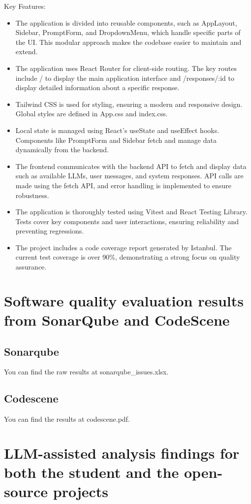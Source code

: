 \documentclass[sigconf]{acmart}
\begin{document}
Key Features:
\begin{itemize}
\item The application is divided into reusable components, such as AppLayout, Sidebar, PromptForm, and DropdownMenu, which handle specific parts of the UI. This modular approach makes the codebase easier to maintain and extend.
\item The application uses React Router for client-side routing. The key routes include / to display the main application interface and /responses/:id to display detailed information about a specific response.
\item Tailwind CSS is used for styling, ensuring a modern and responsive design. Global styles are defined in App.css and index.css.
\item Local state is managed using React's useState and useEffect hooks. Components like PromptForm and Sidebar fetch and manage data dynamically from the backend.
\item The frontend communicates with the backend API to fetch and display data such as available LLMs, user messages, and system responses. API calls are made using the fetch API, and error handling is implemented to ensure robustness.
\item The application is thoroughly tested using Vitest and React Testing Library. Tests cover key components and user interactions, ensuring reliability and preventing regressions.
\item The project includes a code coverage report generated by Istanbul. The current test coverage is over 90\%, demonstrating a strong focus on quality assurance.
\end{itemize}

\section{Software quality evaluation results from SonarQube and CodeScene}
\subsection{Sonarqube}
You can find the raw results at sonarqube\_issues.xlsx.

\subsection{Codescene}
You can find the results at codescene.pdf.

\section{LLM-assisted analysis findings for both the student and the open-source projects}
\end{document}
